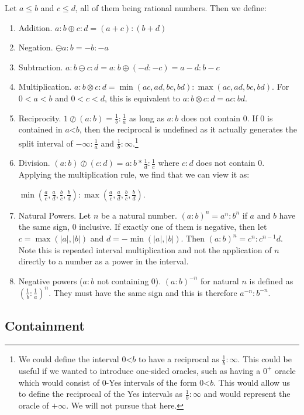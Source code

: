 \documentclass[12pt]{article}
\theoremstyle{remark}
\newcommand{\lt}{\mathord{<}}
\begin{document}
Let $a \leq b$ and $c \leq d$, all of them being rational numbers. Then we define:
\begin{enumerate}
    \item Addition. $a:b \oplus c:d = (a+c):(b+d)$
    \item Negation. $\ominus a:b = -b:-a$
    \item Subtraction. $a:b \ominus c:d = a:b \oplus (-d:-c) = a-d:b-c$
    \item Multiplication. $a:b \otimes c:d = \min(ac, ad, bc, bd): \max(ac,ad,bc,bd)$. For $0<a<b$ and $0<c<d$, this is equivalent to $a:b \otimes c:d = ac:bd$. 
    \item Reciprocity. $1 \oslash (a:b) = \frac{1}{b}:\frac{1}{a}$ as long as $a:b$ does not contain 0. If 0 is contained in $a \lt b$, then the reciprocal is undefined as it actually generates the split interval of $-\infty:\frac{1}{a}$ and $\frac{1}{b}:\infty$.\footnote{We could define the interval $0 \lt b$ to have a reciprocal as $\frac{1}{b}:\infty$. This could be useful if we wanted to introduce one-sided oracles, such as having a $0^+$ oracle which would consist of $0$-Yes intervals of the form $0\lt b$. This would allow us to define the reciprocal of the Yes intervals as $\frac{1}{b}:\infty$ and would represent the oracle of $+ \infty$. We will not pursue that here.  }
    \item Division. $(a:b) \oslash (c:d) = a:b * \frac{1}{d}:\frac{1}{c}$ where $c:d$ does not contain 0. Applying the multiplication rule, we find that we can view it as:
    
    $\min(\frac{a}{c}, \frac{a}{d}, \frac{b}{c}, \frac{b}{d}): \max(\frac{a}{c},\frac{a}{d},\frac{b}{c},\frac{b}{d})$. 
    \item Natural Powers. Let $n$ be a natural number. $(a:b)^n = a^n:b^n$ if $a$ and $b$ have the same sign, 0 inclusive. If exactly one of them is negative, then let $c = \max (|a|, |b|)$ and $d=-\min(|a|, |b|)$. Then $(a:b)^n = c^n: c^{n-1}d $. Note this is repeated interval multiplication and not the application of $n$ directly to a number as a power in the interval. 
    \item Negative powers ($a:b$ not containing 0). $(a:b)^{-n}$ for natural $n$ is defined as $(\frac{1}{b}:\frac{1}{a})^n$. They must have the same sign and this is therefore $a^{-n} : b^{-n}$.
\end{enumerate}

\subsection{Containment}\label{containment}
\end{document}
